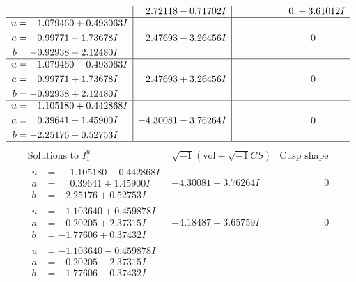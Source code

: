 \documentclass[1p]{elsarticle_modified}
\theoremstyle{definition}
\newcommand{\I}{\sqrt{-1}}
\begin{document}
$$\begin{array}{c|c|c}
 & \phantom{-}2.72118 - 0.71702 I & \phantom{-0.000000 -}0. + 3.61012 I \\ \hline\begin{aligned}
u &= \phantom{-}1.079460 + 0.493063 I \\
a &= \phantom{-}0.99771 - 1.73678 I \\
b &= -0.92938 - 2.12480 I\end{aligned}
 & \phantom{-}2.47693 - 3.26456 I & \phantom{-0.000000 } 0 \\ \hline\begin{aligned}
u &= \phantom{-}1.079460 - 0.493063 I \\
a &= \phantom{-}0.99771 + 1.73678 I \\
b &= -0.92938 + 2.12480 I\end{aligned}
 & \phantom{-}2.47693 + 3.26456 I & \phantom{-0.000000 } 0 \\ \hline\begin{aligned}
u &= \phantom{-}1.105180 + 0.442868 I \\
a &= \phantom{-}0.39641 - 1.45900 I \\
b &= -2.25176 - 0.52753 I\end{aligned}
 & -4.30081 - 3.76264 I & \phantom{-0.000000 } 0\\
 \hline 
 \end{array}$$\newpage$$\begin{array}{c|c|c}  
\text{Solutions to }I^u_{1}& \I (\text{vol} + \sqrt{-1}CS) & \text{Cusp shape}\\
 \hline 
\begin{aligned}
u &= \phantom{-}1.105180 - 0.442868 I \\
a &= \phantom{-}0.39641 + 1.45900 I \\
b &= -2.25176 + 0.52753 I\end{aligned}
 & -4.30081 + 3.76264 I & \phantom{-0.000000 } 0 \\ \hline\begin{aligned}
u &= -1.103640 + 0.459878 I \\
a &= -0.20205 + 2.37315 I \\
b &= -1.77606 + 0.37432 I\end{aligned}
 & -4.18487 + 3.65759 I & \phantom{-0.000000 } 0 \\ \hline\begin{aligned}
u &= -1.103640 - 0.459878 I \\
a &= -0.20205 - 2.37315 I \\
b &= -1.77606 - 0.37432 I\end{aligned}

\end{array}$$
\end{document}
